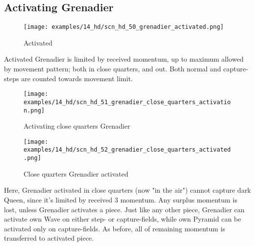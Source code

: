 \subsection*{Activating Grenadier}
\label{sec:Hemera's Dawn/Grenadier/Activating Grenadier}

\vspace*{-0.7\baselineskip}
\noindent
\begin{wrapfigure}[7]{l}{0.4\textwidth}
\centering
\texttt{[image: examples/14\_hd/scn\_hd\_50\_grenadier\_activated.png]}
\vspace*{-0.5\baselineskip}
\caption{Activated}
\label{fig:scn_hd_50_grenadier_activated}
\end{wrapfigure}
Activated Grenadier is limited by received momentum, up to maximum allowed by movement
pattern; both in close quarters, and out. Both normal and capture-steps are counted
towards movement limit.

\vspace*{-0.7\baselineskip}
\noindent
\begin{figure}[!h]
\texttt{[image: examples/14\_hd/scn\_hd\_51\_grenadier\_close\_quarters\_activation.png]}
\vspace*{-1.4\baselineskip}
\caption{Activating close quarters Grenadier}
\label{fig:scn_hd_51_grenadier_close_quarters_activation}
\end{figure}

\vspace*{-1.2\baselineskip}
\noindent
\begin{figure}[!h]
\texttt{[image: examples/14\_hd/scn\_hd\_52\_grenadier\_close\_quarters\_activated.png]}
\vspace*{-1.4\baselineskip}
\caption{Close quarters Grenadier activated}
\label{fig:scn_hd_52_grenadier_close_quarters_activated}
\end{figure}

\vspace*{-0.5\baselineskip}
Here, Grenadier activated in close quarters (now "in the air") cannot capture dark
Queen, since it's limited by received 3 momentum. \newline
\indent
Any surplus momentum is lost, unless Grenadier activates a piece. Just like any
other piece, Grenadier can activate own Wave on either step- or capture-fields,
while own Pyramid can be activated only on capture-fields. As before, all of
remaining momentum is transferred to activated piece.

